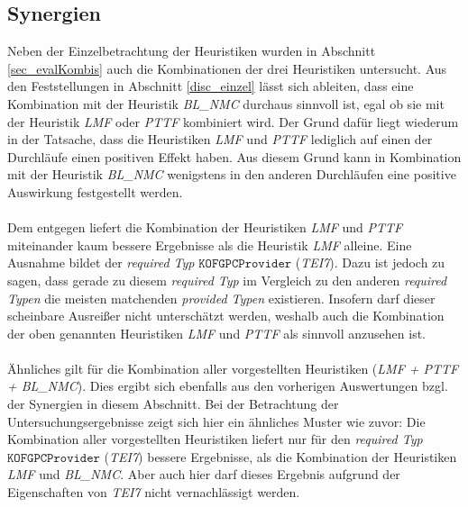 \subsection{Synergien}\label{disc_synergien}
Neben der Einzelbetrachtung der \Gls{Heuristik}en wurden in Abschnitt \ref{sec_evalKombis} auch die Kombinationen der drei \Gls{Heuristik}en untersucht. Aus den Feststellungen in Abschnitt \ref{disc_einzel} lässt sich ableiten, dass eine Kombination mit der \Gls{Heuristik} \emph{BL\_NMC} durchaus sinnvoll ist, egal ob sie mit der \Gls{Heuristik} \emph{LMF} oder \emph{PTTF} kombiniert wird. Der Grund dafür liegt wiederum in der Tatsache, dass die \Gls{Heuristik}en \emph{LMF} und \emph{PTTF} lediglich auf einen der Durchläufe einen positiven Effekt haben. Aus diesem Grund kann in Kombination mit der \Gls{Heuristik} \emph{BL\_NMC} wenigstens in den anderen Durchläufen eine positive Auswirkung festgestellt werden.
\\\\
Dem entgegen liefert die Kombination der \Gls{Heuristik}en \emph{LMF} und \emph{PTTF} miteinander kaum bessere Ergebnisse als die \Gls{Heuristik} \emph{LMF} alleine. Eine Ausnahme bildet der \emph{required Typ} $\texttt{KOFGPCProvider}$ (\emph{TEI7}). Dazu ist jedoch zu sagen, dass gerade zu diesem \emph{required Typ} im Vergleich zu den anderen \emph{required Typen} die meisten matchenden \emph{provided Typen} existieren. Insofern darf dieser scheinbare Ausreißer nicht unterschätzt werden, weshalb auch die Kombination der oben genannten \Gls{Heuristik}en \emph{LMF} und \emph{PTTF} als sinnvoll anzusehen ist.
\\\\
Ähnliches gilt für die Kombination aller vorgestellten \Gls{Heuristik}en (\emph{LMF + PTTF + BL\_NMC}). Dies ergibt sich ebenfalls aus den vorherigen Auswertungen bzgl. der Synergien in diesem Abschnitt. Bei der Betrachtung der Untersuchungsergebnisse zeigt sich hier ein ähnliches Muster wie zuvor: Die Kombination aller vorgestellten \Gls{Heuristik}en liefert nur für den \emph{required Typ} $\texttt{KOFGPCProvider}$ (\emph{TEI7}) bessere Ergebnisse, als die Kombination der \Gls{Heuristik}en \emph{LMF} und \emph{BL\_NMC}. Aber auch hier darf dieses Ergebnis aufgrund der Eigenschaften von \emph{TEI7} nicht vernachlässigt werden.


